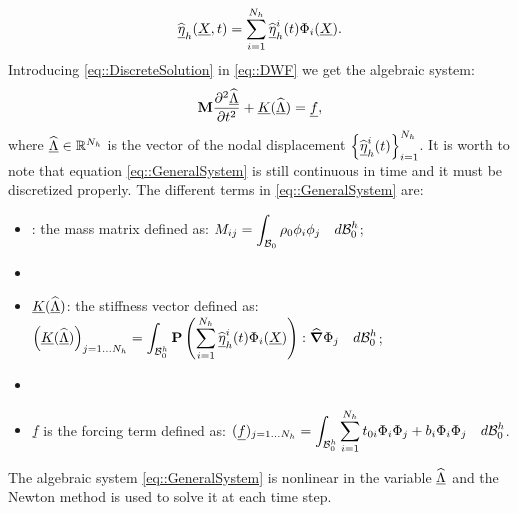 \begin{equation} \displaystyle \widehat{\underline{\eta}}_h(\underline{X},t)=
  \sum_{i=1}^{N_h}\widehat{\underline{\eta}}_h^i(t)\Phi_i(\underline{X}).
  \label{eq::DiscreteSolution}
\end{equation} Introducing \eqref{eq::DiscreteSolution} in
\eqref{eq::DWF} we get the algebraic system:
\begin{equation} \textbf{M}\frac{\partial^2\widehat{\underline{\Lambda}}}{\partial t^2}+\underline{K}(\widehat{\underline{\Lambda}})
  = \underline{f},
  \label{eq::GeneralSystem}
\end{equation} where $\widehat{\underline{\Lambda}} \in \mathbb{R}^{N_h}$ is the vector of the nodal
displacement $\left\{\widehat{\underline{\eta}}_h^i(t)\right\}_{i=1}^{N_h}$. It is worth
to note that equation \eqref{eq::GeneralSystem} is still continuous in
time and it must be discretized properly. The different terms in
\eqref{eq::GeneralSystem} are:
\begin{itemize}
\item \mass: the mass matrix defined as: $\displaystyle
  M_{ij}=\int_{\mathcal{B}_0}\rho_0\phi_i\phi_j\quad d\mathcal{B}_0^h$;
\item[]
\item $\underline{K}(\widehat{\underline{\Lambda}})$: the stiffness vector defined as: $\displaystyle
  \left(\underline{K}(\widehat{\underline{\Lambda}})\right)_{j=1\ldots
    N_h}=\int_{\mathcal{B}_0^h}\textbf{P}\left(\sum_{i=1}^{N_h}\widehat{\underline{\eta}}_h^i(t)\Phi_i(\underline{X})\right):\widehat{\boldsymbol{\nabla}}\Phi_j\quad
  d \mathcal{B}_0^h$;
\item[]
\item $\underline{f}$ is the forcing term defined as: $\displaystyle
  (\underline{f})_{j=1\ldots
    N_h}=\int_{\mathcal{B}_0^h}\sum_{i=1}^{N_h}t_{0i}\Phi_i\Phi_j+b_i\Phi_i\Phi_j\quad
  d\mathcal{B}_0^h$.
\end{itemize} The algebraic system \eqref{eq::GeneralSystem} is
nonlinear in the variable $\widehat{\underline{\Lambda}}$ and the Newton method is used to
solve it at each time step.

